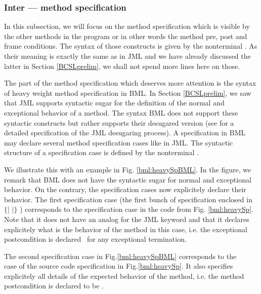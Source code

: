 

\subsubsection{Inter --- method specification}

 In this subsection, we will focus on the method specification which is visible by the other methods in the program
 or in other words the method pre, post and frame conditions. 
 The syntax of those constructs is given by the nonterminal
 \MethodSpec. As their meaning is exactly the same as in JML and we have already discussed the latter
  in Section \ref{BCSLprelim}, we shall not spend more lines here on those.

 The part of the method specification which deserves more attention 
 is the syntax of heavy weight method specification in BML. 
 In Section \ref{BCSLprelim}, we saw that JML supports syntactic sugar for
 the definition of the normal and exceptional behavior of a method. 
 The syntax BML does not
 support these syntactic constructs but rather supports their desugared version
 (see \cite{RT03djml} for a detailed specification of the JML desugaring process).
 A specification in BML may declare several method specification cases like in JML.
 The syntactic structure of a specification case is defined by the nonterminal \specCase.



 We illustrate this with an example in Fig. \ref{bml:heavySpBML}.
 In the figure, we remark that BML does not have the syntactic sugar for normal and exceptional behavior.
 On the contrary, the specification cases now explicitely declare their behavior. 
 The first specification case (the first bunch of specification enclosed in $\{|$ $ |\}$  ) corresponds to the
  specification case in the code from Fig. \ref{bml:heavySp}.
 Note that it does not have an analog for the JML keyword
  and that it declares explicitely what is the behavior
 of the method in this case,  i.e. the exceptional postcondition is declared \false \
 for any exceptional termination.

 The second specification case in Fig.\ref{bml:heavySpBML}  corresponds to the ~ \\
\jmlKey{behavior} case of the source code
 specification in Fig.\ref{bml:heavySp}. It also specifies explicitely all details of the expected behavior of
 the method, i.e. the method postcondition is declared to be \false. 
 




